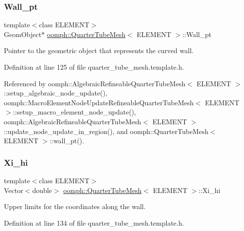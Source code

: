\subsubsection{\texorpdfstring{Wall\+\_\+pt}{Wall\_pt}}
{\footnotesize\ttfamily template$<$class E\+L\+E\+M\+E\+NT$>$ \\
Geom\+Object$\ast$ \hyperlink{classoomph_1_1QuarterTubeMesh}{oomph\+::\+Quarter\+Tube\+Mesh}$<$ E\+L\+E\+M\+E\+NT $>$\+::Wall\+\_\+pt\hspace{0.3cm}{\ttfamily [protected]}}



Pointer to the geometric object that represents the curved wall. 



Definition at line 125 of file quarter\+\_\+tube\+\_\+mesh.\+template.\+h.



Referenced by oomph\+::\+Algebraic\+Refineable\+Quarter\+Tube\+Mesh$<$ E\+L\+E\+M\+E\+N\+T $>$\+::setup\+\_\+algebraic\+\_\+node\+\_\+update(), oomph\+::\+Macro\+Element\+Node\+Update\+Refineable\+Quarter\+Tube\+Mesh$<$ E\+L\+E\+M\+E\+N\+T $>$\+::setup\+\_\+macro\+\_\+element\+\_\+node\+\_\+update(), oomph\+::\+Algebraic\+Refineable\+Quarter\+Tube\+Mesh$<$ E\+L\+E\+M\+E\+N\+T $>$\+::update\+\_\+node\+\_\+update\+\_\+in\+\_\+region(), and oomph\+::\+Quarter\+Tube\+Mesh$<$ E\+L\+E\+M\+E\+N\+T $>$\+::wall\+\_\+pt().

\mbox{\label{classoomph_1_1QuarterTubeMesh_aabb226a0b0208c579f426e58d944685c}} 
\subsubsection{\texorpdfstring{Xi\+\_\+hi}{Xi\_hi}}
{\footnotesize\ttfamily template$<$class E\+L\+E\+M\+E\+NT$>$ \\
Vector$<$double$>$ \hyperlink{classoomph_1_1QuarterTubeMesh}{oomph\+::\+Quarter\+Tube\+Mesh}$<$ E\+L\+E\+M\+E\+NT $>$\+::Xi\+\_\+hi\hspace{0.3cm}{\ttfamily [protected]}}



Upper limits for the coordinates along the wall. 



Definition at line 134 of file quarter\+\_\+tube\+\_\+mesh.\+template.\+h.



